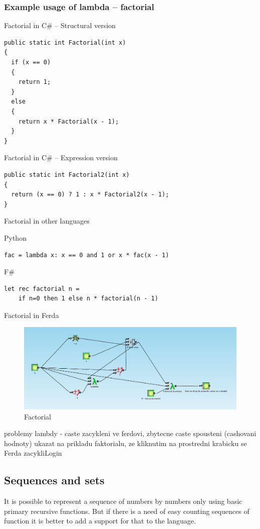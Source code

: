 \documentclass[a4paper,12pt]{book}
\begin{document}
\subsubsection{Example usage of lambda -- factorial}
Factorial in C\# -- Structural version

\begin{verbatim}
public static int Factorial(int x)
{
  if (x == 0)
  {
    return 1;
  }
  else
  {
    return x * Factorial(x - 1);
  }
}
\end{verbatim}
	
Factorial in C\# -- Expression version

\begin{verbatim}
public static int Factorial2(int x)
{
  return (x == 0) ? 1 : x * Factorial2(x - 1);
}
\end{verbatim}

Factorial in other languages

Python
\begin{verbatim}
fac = lambda x: x == 0 and 1 or x * fac(x - 1)
\end{verbatim}

F\#
\begin{verbatim}
let rec factorial n =
    if n=0 then 1 else n * factorial(n - 1)
\end{verbatim}
	
Factorial in Ferda
\begin{figure}
\includegraphics[width=13.72cm]{faktorial}
	\caption{Factorial}
\end{figure}

problemy lambdy - caste zacykleni ve ferdovi, zbytecne caste spousteni (cashovani hodnoty)
ukazat na prikladu faktorialu, ze kliknutim na prostredni krabicku se Ferda zacykliLogin

\subsection{Sequences and sets}
\label{sec:sequences}
It is possible to represent a sequence of numbers by numbers only using basic primary recursive functions. But if there is a need of easy counting sequences of function it is better to add a support for that to the language.
\end{document}

